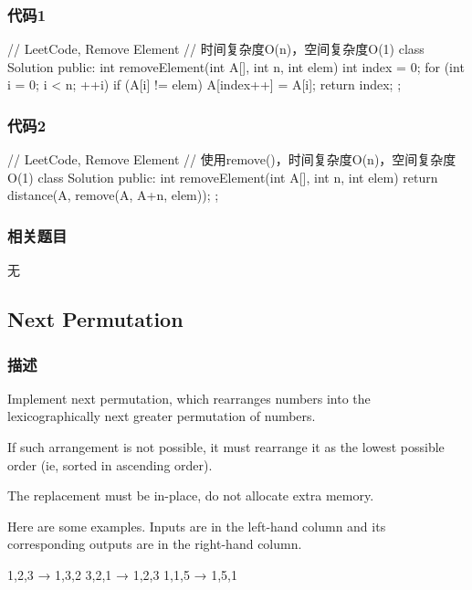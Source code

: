 \subsubsection{代码1}
\begin{Code}
	// LeetCode, Remove Element
	// 时间复杂度O(n)，空间复杂度O(1)
	class Solution {
		public:
		int removeElement(int A[], int n, int elem) {
			int index = 0;
			for (int i = 0; i < n; ++i) {
				if (A[i] != elem) {
					A[index++] = A[i];
				}
			}
			return index;
		}
	};
\end{Code}


\subsubsection{代码2}
\begin{Code}
	// LeetCode, Remove Element
	// 使用remove()，时间复杂度O(n)，空间复杂度O(1)
	class Solution {
		public:
		int removeElement(int A[], int n, int elem) {
			return distance(A, remove(A, A+n, elem));
		}
	};
\end{Code}


\subsubsection{相关题目}
\begindot
\item 无
\myenddot


\subsection{Next Permutation} %
\label{sec:next-permutation}


\subsubsection{描述}
Implement next permutation, which rearranges numbers into the lexicographically 
next greater permutation of numbers.

If such arrangement is not possible, it must rearrange it as the lowest 
possible order (ie, sorted in ascending order).

The replacement must be in-place, do not allocate extra memory.

Here are some examples. Inputs are in the left-hand column and its 
corresponding outputs are in the right-hand column.
\begin{Code}
	1,2,3 → 1,3,2
	3,2,1 → 1,2,3
	1,1,5 → 1,5,1
\end{Code}


